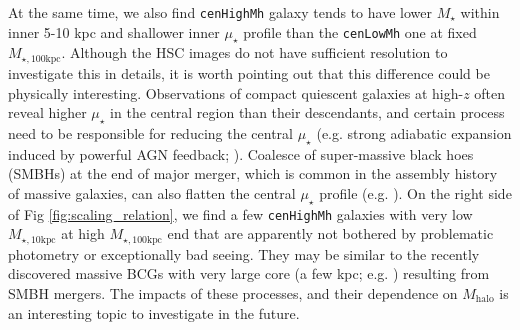 \documentclass{emulateapj}
\def\rbcg{\texttt{cenHighMh}}
\def\nbcg{\texttt{cenLowMh}}
\def\mstar{{$M_{\star}$}}
\def\mhalo{{$M_{\mathrm{halo}}$}}
\def\minn{{$M_{\star,10\mathrm{kpc}}$}}
\def\mtot{{$M_{\star,100\mathrm{kpc}}$}}
\def\mden{{$\mu_{\star}$}}
\begin{document}
\begin{CJK*}{UTF8}{gbsn}
    At the same time, we also find \rbcg{} galaxy tends to have lower \mstar{} within 
    inner 5-10 kpc and shallower inner \mden{} profile than the \nbcg{} one at 
    fixed \mtot{}. 
    Although the HSC images do not have sufficient resolution to investigate this in 
    details, it is worth pointing out that this difference could be physically 
    interesting. 
    Observations of compact quiescent galaxies at high-$z$ often reveal higher 
    \mden{} in the central region than their descendants, and certain process need to  
    be responsible for reducing the central \mden{} (e.g. strong adiabatic expansion 
    induced by powerful AGN feedback; \citealt{Fan2008}).
    Coalesce of super-massive black hoes (SMBHs) at the end of major merger, which is 
    common in the assembly history of massive galaxies, can also flatten the central 
    \mden{} profile (e.g. \citealt{Milosavljevi2002}).
    On the right side of Fig \ref{fig:scaling_relation}, we find a few \rbcg{} galaxies 
    with very low \minn{} at high \mtot{} end that are apparently not bothered by 
    problematic photometry or exceptionally bad seeing.  
    They may be similar to the recently discovered massive BCGs with very large core 
    (a few kpc; e.g. \citealt{Postman2012, LopezCruz2014}) resulting from SMBH mergers.
    The impacts of these processes, and their dependence on \mhalo{} is an interesting 
    topic to investigate in the future.


\end{CJK*}
\end{document}

